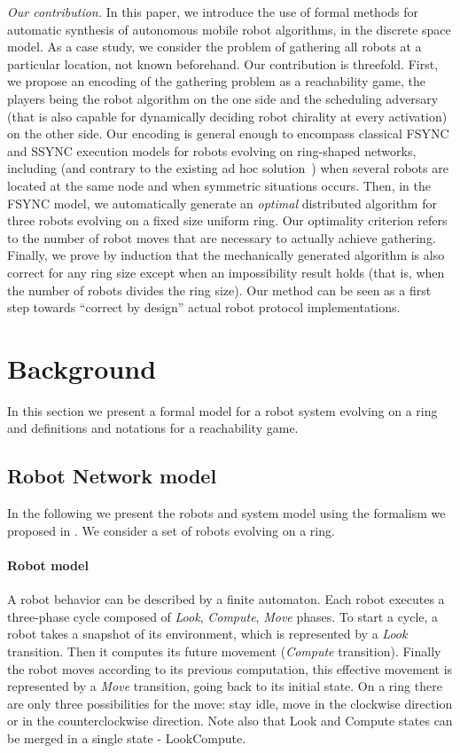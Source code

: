 \documentclass[envcountsame]{llncs} \usepackage[english]{babel}
\begin{document}
\textit{Our contribution.} In this paper, we introduce the use of formal methods for automatic synthesis of autonomous mobile robot algorithms, in the discrete space model. As a case study, we consider the problem of gathering all robots at a particular location, not known beforehand. Our contribution is threefold. First, we propose an encoding of the gathering problem as a reachability game, the players being the robot algorithm on the one side and the scheduling adversary (that is also capable for dynamically deciding robot chirality at every activation) on the other side. Our encoding is general enough to encompass classical FSYNC and SSYNC execution models for robots evolving on ring-shaped networks, including (and contrary to the existing ad hoc solution~\cite{BDPPT12c}) when several robots are located at the same node and when symmetric situations occurs. Then, in the FSYNC model, we automatically generate an \emph{optimal} distributed algorithm for three robots evolving on a fixed size uniform ring. Our optimality criterion refers to the number of robot moves that are necessary to actually achieve gathering. Finally, we prove by induction that the mechanically generated algorithm is also correct for any ring size except when an impossibility result holds (that is, when the number of robots divides the ring size). Our method can be seen as a first step towards  ``correct by design'' actual robot protocol implementations. 
 
\section{Background}
In this section we present a formal model for a robot system evolving on a ring and definitions and notations for a reachability game.

\subsection{Robot Network model}
In the following we present the robots and system model using the formalism we proposed in \cite{BMPTT13c}. 
We consider a set of robots evolving on a ring.

\paragraph{Robot model}
 A robot behavior can be described by a finite automaton.
Each robot executes a three-phase cycle composed of \textit{Look}, \textit{Compute}, \textit{Move} phases. 
To start a cycle, a robot  takes a snapshot of its environment, which is
represented by a \textit{Look} transition. Then it computes its future
movement (\textit{Compute} transition). Finally the robot moves according to its previous computation, this effective movement is
represented by a \textit{Move} transition, going back to its initial state. On a ring there are only
three possibilities for the move: stay idle, move in the clockwise direction
or in the counterclockwise direction. Note also that Look and Compute states can be merged in a single state - LookCompute.
\end{document}

